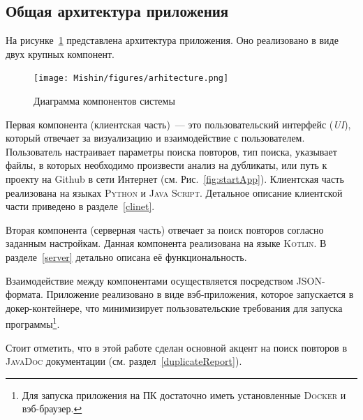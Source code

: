 

\subsection{Общая архитектура приложения}
На рисунке~\ref{fig:application} представлена архитектура приложения.
Оно реализовано в виде двух крупных компонент.

\begin{figure}[H]
    \texttt{[image: Mishin/figures/arhitecture.png]}
    \caption{Диаграмма компонентов системы}\label{fig:application}
\end{figure}


Первая компонента (клиентская часть)~--- это пользовательский интерфейс (\emph{UI}), который отвечает за визуализацию и взаимодействие с пользователем.
Пользователь настраивает параметры поиска повторов, тип поиска, указывает файлы, в которых необходимо произвести анализ на дубликаты, или путь к проекту на Github в сети Интернет (см. Рис.~\ref{fig:startApp}).
Клиентская часть реализована на языках \textsc{Python} и \textsc{Java Script}.
Детальное описание клиентской части приведено в разделе~\ref{clinet}.

Вторая компонента (серверная часть) отвечает за поиск повторов согласно заданным настройкам.
Данная компонента реализована на языке \textsc{Kotlin}.
В разделе~\ref{server} детально описана её функциональность.

Взаимодействие между компонентами осуществляется посредством \textsc{JSON}-формата.
Приложение реализовано в виде вэб-приложения, которое запускается в докер-контейнере, что минимизирует пользовательские требования для запуска программы\footnote{Для запуска приложения на ПК достаточно иметь установленные \textsc{Docker} и вэб-браузер.}.

Стоит отметить, что в этой работе сделан основной акцент на поиск повторов в \textsc{JavaDoc} документации (см. раздел~\ref{duplicateReport}).

